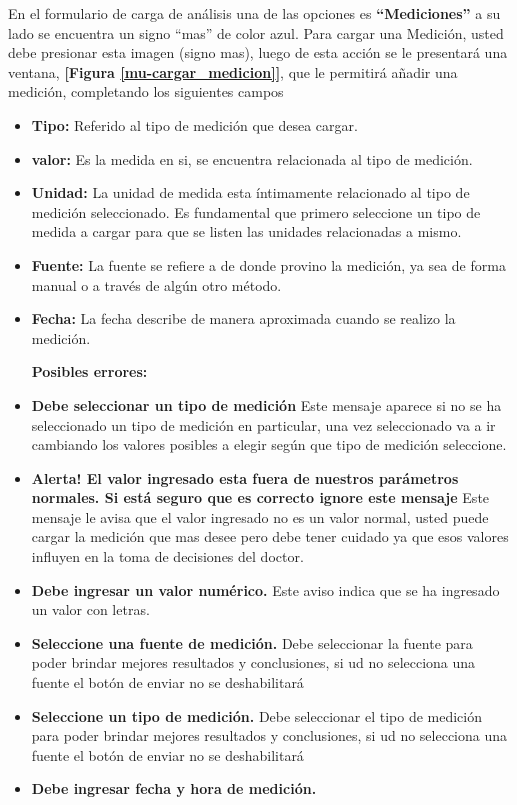  	En el formulario de carga de análisis una de las opciones es \textbf{``Mediciones''} a su lado se encuentra  un signo ``mas'' de color azul. Para cargar una Medición, usted debe presionar esta imagen (signo mas), luego de esta acción se le presentará una ventana, \textbf{[Figura \ref{mu-cargar_medicion}]}, que le permitirá añadir una medición, completando los siguientes campos
 	\begin{itemize}
 		\item \textbf{Tipo: } Referido al tipo de medición que desea cargar.
 		\item \textbf{valor:} Es la medida en si, se encuentra relacionada al tipo de medición.
 		\item \textbf{Unidad: } La unidad de medida esta íntimamente relacionado al tipo de medición seleccionado. Es fundamental que primero seleccione un tipo de medida a cargar para que se listen las unidades relacionadas a mismo.
 		\item \textbf{Fuente:} La fuente se refiere a de donde provino la medición, ya sea de forma manual o a través de algún otro método.
 		\item \textbf{Fecha:} La fecha describe de manera aproximada cuando se realizo la medición.
 		
 		\textbf{Posibles errores:}
	\end{itemize}	
 		\begin{itemize}
 				\item \textbf{Debe seleccionar un tipo de medición} Este mensaje aparece si no se ha seleccionado un tipo de medición en particular, una vez seleccionado va a ir cambiando los valores posibles a elegir según que tipo de medición seleccione.
 				\item \textbf{Alerta! El valor ingresado esta fuera de nuestros parámetros normales. Si está seguro que es correcto ignore este mensaje} Este mensaje le avisa que el valor ingresado no es un valor normal, usted puede cargar la medición que mas desee pero debe tener cuidado ya que esos valores influyen en la toma de decisiones del doctor.
 				\item \textbf{Debe ingresar un valor numérico.} Este aviso indica que se ha ingresado un valor con letras.
 				\item \textbf{Seleccione una fuente de medición.} Debe seleccionar la fuente para poder brindar mejores resultados y conclusiones, si ud no selecciona una fuente el botón de enviar no se deshabilitará
 				\item \textbf{Seleccione un tipo de medición.} Debe seleccionar el tipo de medición para poder brindar mejores resultados y conclusiones, si ud no selecciona una fuente el botón de enviar no se deshabilitará
	 			\item \textbf{Debe ingresar fecha y hora de medición. }
 		\end{itemize}
 
